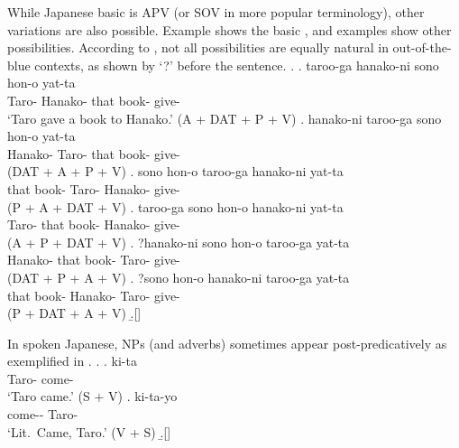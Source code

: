 While Japanese basic  is APV (or SOV in more popular terminology),
other variations are also possible.
Example \Next[a] shows the basic , and
examples \Next[b--f] show other possibilities.
According to ,
not all possibilities are equally natural in out-of-the-blue contexts,
as shown by `?' before the sentence.
%
\ex.
 \ag. taroo-ga hanako-ni sono hon-o yat-ta \\
      Taro- Hanako- that book- give- \\
      `Taro gave a book to Hanako.' \hfill{(A + DAT + P + V)}
 \bg. hanako-ni taroo-ga sono hon-o yat-ta \\
      Hanako- Taro- that book- give- \\
      \hfill{(DAT + A + P + V)}
 \bg. sono hon-o taroo-ga hanako-ni yat-ta \\
      that book- Taro- Hanako- give- \\
      \hfill{(P + A + DAT + V)}
 \bg. taroo-ga sono hon-o hanako-ni yat-ta \\
      Taro- that book- Hanako- give- \\
      \hfill{(A + P + DAT + V)}
 \bg. ?hanako-ni sono hon-o taroo-ga yat-ta \\
      Hanako- that book- Taro- give- \\
      \hfill{(DAT + P + A + V)}
 \bg. ?sono hon-o hanako-ni taroo-ga yat-ta \\
      that book- Hanako-  Taro- give- \\
      \hfill{(P + DAT + A + V)}
 \b.[] \hfill{\cite[260]{shibatani90}}

In spoken Japanese,
NPs (and adverbs) sometimes appear post-predicatively as exemplified in \Next[b].
%
\ex.
 \ag.  ki-ta \\
      Taro- come- \\
      `Taro came.' \hfill{(S + V)}
 \bg. ki-ta-yo  \\
      come-- Taro- \\
      `Lit.~Came, Taro.' \hfill{(V + S)}
 \b.[] \hfill{\cite[258--259]{shibatani90}}



